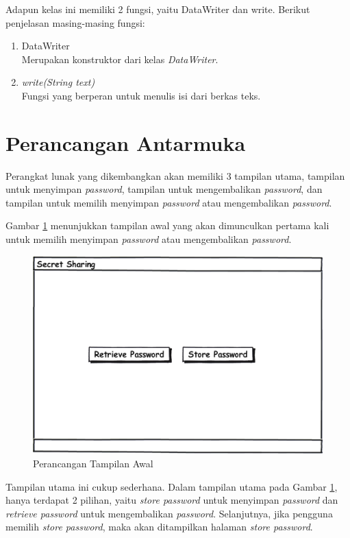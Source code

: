 Adapun kelas ini memiliki 2 fungsi, yaitu DataWriter dan write. Berikut penjelasan masing-masing fungsi:

\begin{enumerate}
	\item DataWriter \\
	Merupakan konstruktor dari kelas \textit{DataWriter}.
	\item \textit{write(String text)} \\
	Fungsi yang berperan untuk menulis isi dari berkas teks.
\end{enumerate}

\section{Perancangan Antarmuka}

Perangkat lunak yang dikembangkan akan memiliki 3 tampilan utama, tampilan untuk menyimpan \textit{password}, tampilan untuk mengembalikan \textit{password}, dan tampilan untuk memilih menyimpan \textit{password} atau mengembalikan \textit{password}.

Gambar \ref{fig:tampilan-awal} menunjukkan tampilan awal yang akan dimunculkan pertama kali untuk memilih menyimpan \textit{password} atau mengembalikan \textit{password}.

\begin{figure}[H]
	\centerline{\includegraphics[scale=0.5]{Gambar/tampilan-utama}}
	\caption{Perancangan Tampilan Awal}\label{fig:tampilan-awal}
\end{figure}

Tampilan utama ini cukup sederhana. Dalam tampilan utama pada Gambar \ref{fig:tampilan-awal}, hanya terdapat 2 pilihan, yaitu \textit{store password} untuk menyimpan \textit{password} dan \textit{retrieve password} untuk mengembalikan \textit{password}. Selanjutnya, jika pengguna memilih \textit{store password}, maka akan ditampilkan halaman \textit{store password}.

